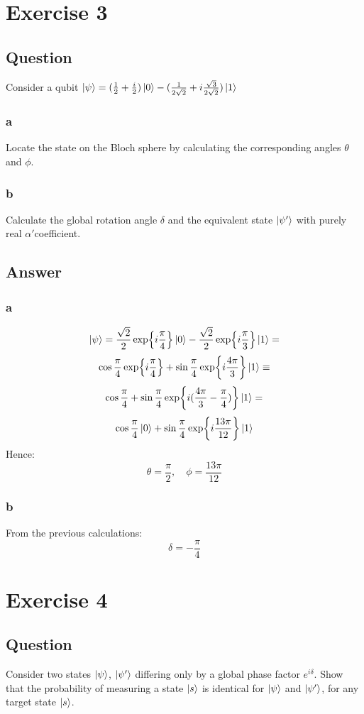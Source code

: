 \documentclass{article}
\begin{document}
\section{Exercise 3}
\subsection{Question}
Consider a qubit $\ket{\psi} = (\frac{1}{2} + \frac{i}{2})\ket{0} - (\frac{1}{2\sqrt{2}} + i\frac{\sqrt{3}}{2\sqrt{2}})\ket{1}$
\subsubsection{a}
Locate the state on the Bloch sphere by calculating the corresponding angles $\theta$ and $\phi$.
\subsubsection{b}
Calculate the global rotation angle $\delta$ and the equivalent state $\ket{\psi'}$ with purely real $\alpha'$coefficient. 
\subsection{Answer}
\subsubsection{a}
$$\ket{\psi} = \frac{\sqrt{2}}{2}\exp{i\frac{\pi}{4}}\ket{0} - \frac{\sqrt{2}}{2}\exp{i\frac{\pi}{3}}\ket{1} =$$
$$\cos{\frac{\pi}{4}}\exp{i\frac{\pi}{4}} + \sin{\frac{\pi}{4}}\exp{i\frac{4\pi}{3}}\ket{1} \equiv $$
$$
\cos{\frac{\pi}{4}} + \sin{\frac{\pi}{4}}\exp{i(\frac{4\pi}{3} - \frac{\pi}{4})}\ket{1} =
$$
$$\cos{\frac{\pi}{4}}\ket{0} + \sin{\frac{\pi}{4}}\exp{i\frac{13\pi}{12}}\ket{1}$$
Hence:
$$\theta = \frac{\pi}{2},\quad \phi = \frac{13\pi}{12}$$

\subsubsection{b}
From the previous calculations:
$$\delta = -\frac{\pi}{4}$$

\section{Exercise 4}
\subsection{Question}
Consider two states $\ket{\psi}$, $\ket{\psi'}$ differing only by a global phase factor $e^{i\delta}$. Show that the probability of measuring a state $\ket{s}$ is identical for $\ket{\psi}$ and $\ket{\psi'}$, for any target state $\ket{s}$. 
\end{document}
